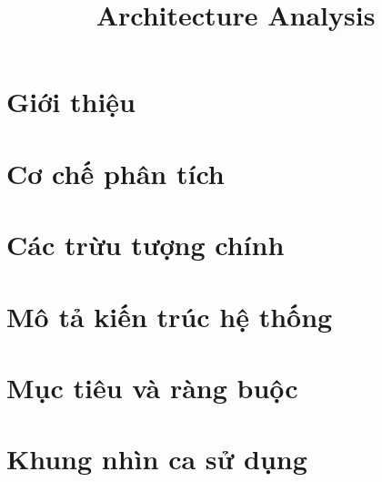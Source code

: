 \documentclass[11pt, a4paper]{article}
\title{Architecture Analysis}
\begin{document}
	
	
	\clearpage
	
	
	\clearpage
	
	\tableofcontents 
	\clearpage
	
	
	
	
	 
	
	
	
	\section{Giới thiệu}
	

	
	\section{Cơ chế phân tích}
	

	
	\section{Các trừu tượng chính}
	

	
	\section{Mô tả kiến trúc hệ thống}
	

	
	\section{Mục tiêu và ràng buộc }
	

	\section{Khung nhìn ca sử dụng}
	
	
\end{document}
